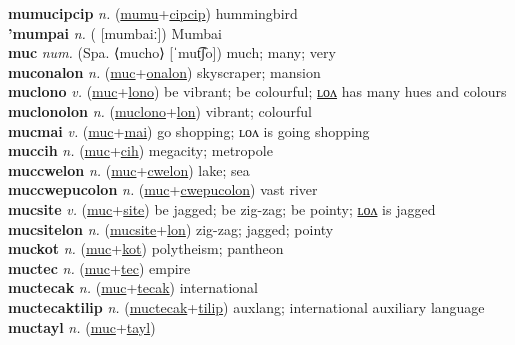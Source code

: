 \textbf{mumucipcip} \textit{n.} (\hyperref[mumu]{mumu}+\hyperref[cipcip]{cipcip})
hummingbird \label{mumucipcip} \\
\textbf{'mumpai} \textit{n.} ( [mumbaiː])
Mumbai \label{'mumpai} \\
\textbf{muc} \textit{num.} (Spa. ⟨mucho⟩ [ˈmut͡ʃo])
much; many; very \label{muc} \\
\textbf{muconalon} \textit{n.} (\hyperref[muc]{muc}+\hyperref[onalon]{onalon})
skyscraper; mansion \label{muconalon} \\
\textbf{muclono} \textit{v.} (\hyperref[muc]{muc}+\hyperref[lono]{lono})
be vibrant; be colourful; \hyperref[muclonolon]{ʟᴏᴧ} has many hues and colours \label{muclono} \\
\textbf{muclonolon} \textit{n.} (\hyperref[muclono]{muclono}+\hyperref[lon]{lon})
vibrant; colourful \label{muclonolon} \\
\textbf{mucmai} \textit{v.} (\hyperref[muc]{muc}+\hyperref[mai]{mai})
go shopping; ʟᴏᴧ is going shopping \label{mucmai} \\
\textbf{muccih} \textit{n.} (\hyperref[muc]{muc}+\hyperref[cih]{cih})
megacity; metropole \label{muccih} \\
\textbf{muccwelon} \textit{n.} (\hyperref[muc]{muc}+\hyperref[cwelon]{cwelon})
lake; sea \label{muccwelon} \\
\textbf{muccwepucolon} \textit{n.} (\hyperref[muc]{muc}+\hyperref[cwepucolon]{cwepucolon})
vast river \label{muccwepucolon} \\
\textbf{mucsite} \textit{v.} (\hyperref[muc]{muc}+\hyperref[site]{site})
be jagged; be zig-zag; be pointy; \hyperref[mucsitelon]{ʟᴏᴧ} is jagged \label{mucsite} \\
\textbf{mucsitelon} \textit{n.} (\hyperref[mucsite]{mucsite}+\hyperref[lon]{lon})
zig-zag; jagged; pointy \label{mucsitelon} \\
\textbf{muckot} \textit{n.} (\hyperref[muc]{muc}+\hyperref[kot]{kot})
polytheism; pantheon \label{muckot} \\
\textbf{muctec} \textit{n.} (\hyperref[muc]{muc}+\hyperref[tec]{tec})
empire \label{muctec} \\
\textbf{muctecak} \textit{n.} (\hyperref[muc]{muc}+\hyperref[tecak]{tecak})
international \label{muctecak} \\
\textbf{muctecaktilip} \textit{n.} (\hyperref[muctecak]{muctecak}+\hyperref[tilip]{tilip})
auxlang; international auxiliary language \label{muctecaktilip} \\
\textbf{muctayl} \textit{n.} (\hyperref[muc]{muc}+\hyperref[tayl]{tayl})
